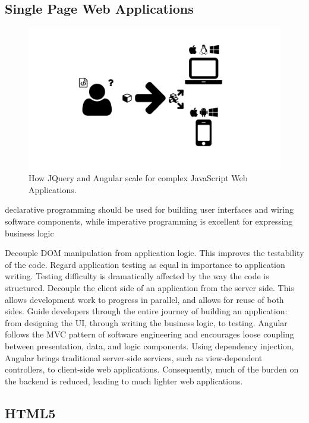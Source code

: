 \subsection{Single Page Web Applications}

\begin{figure}
  \centering
  \includegraphics[width=\textwidth, page=3]{images/Figures.pdf}
  \caption{How JQuery and Angular scale for complex JavaScript Web Applications.}
  \label{Figure:jquery-vs-angular}
\end{figure}

declarative programming should be used for building user interfaces and wiring software components, while imperative programming is excellent for expressing business logic


Decouple DOM manipulation from application logic. This improves the testability of the code. Regard application testing as equal in importance to application writing. Testing difficulty is dramatically affected by the way the code is structured.
Decouple the client side of an application from the server side. This allows development work to progress in parallel, and allows for reuse of both sides.
Guide developers through the entire journey of building an application: from designing the UI, through writing the business logic, to testing.
Angular follows the MVC pattern of software engineering and encourages loose coupling between presentation, data, and logic components. Using dependency injection, Angular brings traditional server-side services, such as view-dependent controllers, to client-side web applications. Consequently, much of the burden on the backend is reduced, leading to much lighter web applications.

\subsection{HTML5}
\label{sec:html5}

